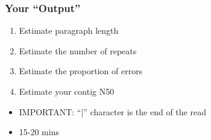 \documentclass[14pt,handout]{beamer}
\begin{document}
\begin{frame}
\frametitle{Your ``Output''}
\begin{enumerate}
	\item<+-> Estimate paragraph length
	\item<+-> Estimate the number of repeats
	\item<+-> Estimate the proportion of errors
	\item<+-> Estimate your contig N50
\end{enumerate}
\begin{itemize}
	\item<+-> IMPORTANT: ``|'' character is the end of the read
	\item<+-> 15-20 mins
\end{itemize}
\end{frame}


\end{document}
